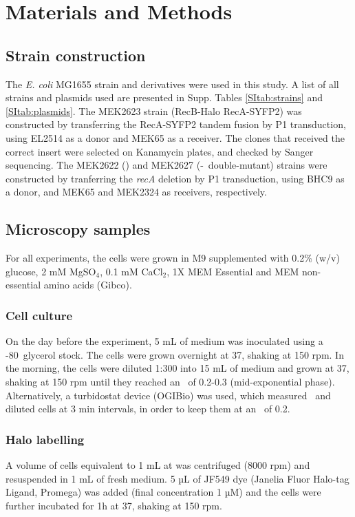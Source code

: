 \section*{Materials and Methods}

\subsection*{Strain construction}
The \textit{E. coli} MG1655 strain and derivatives were used in this study. A list of all strains and plasmids used are presented in Supp. Tables \ref{SItab:strains} and \ref{SItab:plasmids}.
The MEK2623 strain (RecB-Halo RecA-SYFP2) was constructed by transferring the RecA-SYFP2 tandem fusion by P1 transduction, using EL2514\cite{Wiktor2021} as a donor and MEK65\cite{Lepore2019a} as a receiver. The clones that received the correct insert were selected on Kanamycin plates, and checked by Sanger sequencing. The MEK2622 (\dreca) and MEK2627 (\teneighty -\dreca\ double-mutant) strains  were constructed by tranferring the \textit{recA} deletion by P1 transduction, using BHC9 as a donor, and MEK65 and MEK2324 as receivers, respectively.

\subsection*{Microscopy samples}
For all experiments, the cells were grown in M9 supplemented with 0.2\% (w/v) glucose, 2 mM MgSO$_4$, 0.1 mM CaCl$_2$, 1X MEM Essential and MEM non-essential amino acids (Gibco).
\subsubsection*{Cell culture}
On the day before the experiment, 5 mL of medium was inoculated using a -80\celsius\ glycerol stock. The cells were grown overnight at 37\celsius, shaking at 150 rpm. In the morning, the cells were diluted 1:300 into 15 mL of medium and grown at 37\celsius, shaking at 150 rpm until they reached an \od\ of 0.2-0.3 (mid-exponential phase).
Alternatively, a turbidostat device (OGIBio) was used, which measured \od\ and diluted cells at 3 min intervals, in order to keep them at an \od\ of 0.2.
\subsubsection*{Halo labelling}
A volume of cells equivalent to 1 mL at  was centrifuged (8000 rpm) and resuspended in 1 mL of fresh medium. 5 µL of JF549 dye (Janelia Fluor Halo-tag Ligand, Promega) was added (final concentration 1 µM) and the cells were further incubated for 1h at 37\celsius, shaking at 150 rpm.
